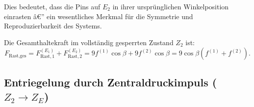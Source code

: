 ﻿\documentclass[12pt, a4paper]{article}
\theoremstyle{remark}
\begin{document}
Dies bedeutet, dass die Pins auf $E_2$ in ihrer ursprünglichen Winkelposition einrasten â€”
ein wesentliches Merkmal für die Symmetrie und Reproduzierbarkeit des Systems.

Die Gesamthaltekraft im vollständig gesperrten Zustand $Z_2$ ist:
\begin{equation}
  \boxed{F_{\text{Rast,ges}} = F_{\text{Rast},1}^{(E_1)} + F_{\text{Rast},2}^{(E_2)} = 9 f^{(1)}\cos\beta + 9 f^{(2)}\cos\beta = 9\cos\beta\left(f^{(1)} + f^{(2)}\right).}
\end{equation}

\subsection{Entriegelung durch Zentraldruckimpuls ($Z_2 \to Z_E$)}
\end{document}

